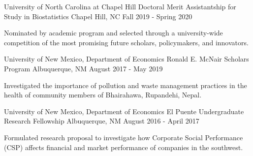 \begin{cventries}

\cventry
{University of North Carolina at Chapel Hill} %
{Doctoral Merit Assistantship for Study in Biostatistics} %
{Chapel Hill, NC} %
{Fall 2019 - Spring 2020} %
{
\begin{cvitems} %
\item Nominated by academic program and selected through a university-wide competition of the most promising \newline future scholars, policymakers, and innovators.
  \end{cvitems}
}

\cventry
{University of New Mexico, Department of Economics} %
{Ronald E. McNair Scholars Program} %
{Albuquerque, NM} %
{August 2017 - May 2019} %
{
\begin{cvitems} %
\item Investigated the importance of pollution and waste management practices in the health of community members \newline of Bhairahawa, Rupandehi, Nepal. %
  \end{cvitems}
}

\cventry
{University of New Mexico, Department of Economics} %
{El Puente Undergraduate Research Fellowship} %
{Albuquerque, NM} %
{August 2016 - April 2017} %
{
\begin{cvitems} %
\item Formulated research proposal to investigate how Corporate Social Performance (CSP) affects financial and market \newline performance of companies in the southwest. %
  \end{cvitems}
}

\end{cventries}
